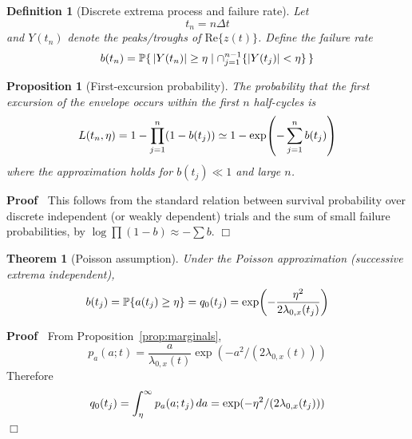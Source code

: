 \documentclass{article}
\newenvironment{proof}{\noindent\textbf{Proof\ }}{\hspace*{\fill}$\Box$\medskip}
\newtheorem{definition}{Definition}
\newtheorem{proposition}{Proposition}
\newtheorem{theorem}{Theorem}
\begin{document}
\begin{definition}
  [Discrete extrema process and failure rate] Let
  \begin{equation}
    t_n = n \Delta t
  \end{equation}
  and $Y (t_n)$ denote the peaks/troughs of $\mathrm{Re} \{z (t)\}$. Define
  the failure rate
  \begin{equation}
    b (t_n) =\mathbb{P} \{ \hspace{0.17em} |Y (t_n) | \ge \eta \mid \cap_{j =
    1}^{n - 1} \{|Y (t_j) | < \eta\} \hspace{0.17em} \}
  \end{equation}
\end{definition}

\begin{proposition}
  [First-excursion probability]\label{prop:first_excursion} The probability
  that the first excursion of the envelope occurs within the first $n$
  half-cycles is
  \begin{equation}
    L (t_n, \eta) = 1 - \prod_{j = 1}^n (1 - b (t_j)) \simeq 1 - \exp
    \hspace{-0.17em} \left( - \sum_{j = 1}^n b (t_j) \right)
  \end{equation}
  where the approximation holds for $b (t_j) \ll 1$ and large $n$.
\end{proposition}

\begin{proof}
  This follows from the standard relation between survival probability over
  discrete independent (or weakly dependent) trials and the sum of small
  failure probabilities, by $\log \prod (1 - b) \approx - \sum b$.
\end{proof}

\begin{theorem}
  [Poisson assumption]\label{thm:poisson} Under the Poisson approximation
  (successive extrema independent),
  \begin{equation}
    b (t_j) =\mathbb{P} \{a (t_j) \ge \eta\} = q_0 (t_j) = \exp
    \hspace{-0.17em} \left( - \frac{\eta^2}{2 \lambda_{0, x} (t_j)} \right)
  \end{equation}
\end{theorem}

\begin{proof}
  From Proposition~\ref{prop:marginals},
  \begin{equation}
    p_a (a ; t) = \frac{a}{\lambda_{0, x} (t)} \exp (- a^2 / (2 \lambda_{0, x}
    (t)))
  \end{equation}
  Therefore
  \begin{equation}
    q_0 (t_j) = \int_{\eta}^{\infty} p_a (a ; t_j)  \hspace{0.17em} da = \exp
    (- \eta^2 / (2 \lambda_{0, x} (t_j)))
  \end{equation}
\end{proof}
\end{document}
